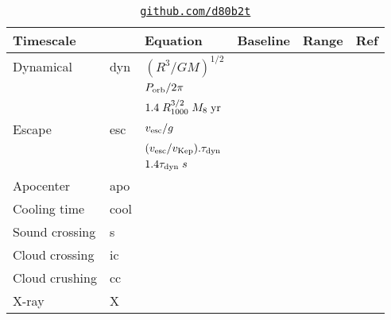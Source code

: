 \documentclass[11pt]{article}
\begin{document}
\newpage


\begin{table}
    \begin{center}
       \begin{tabular}{l l l l l l} 
        \hline
        \hline 
         Timescale   &          & Equation                                                                                                         & Baseline& Range& Ref \\
        \hline  
        \hline 
         Dynamical  & dyn    & $(R^3/GM)^{1/2}$                                            &   & & \\
                            &          & $P_{\rm orb}/2\pi$                                            &   & & \\
                            &          & $1.4 \; R_{1000}^{3/2} \; M_{8} \; {\rm yr}$         &   & & \\
           Escape        &  esc &  $v_{\rm esc} / g$                                              & & & \\
                              &         & $(v_{\rm esc} / v_{\rm Kep}) . \tau_{\rm dyn} $       & & & \\
                            &           & $1.4 \tau_{\rm dyn} \; s $                                 & & & \\
         Apocenter   & apo   &    & & & \\
         Cooling time & cool  &    & & & \\
         Sound crossing &  s  &    & & & \\
         Cloud crossing &  ic &    & & & \\
        Cloud crushing & cc  &    & & & \\
         X-ray & X  &    & & & \\
         \hline
         \hline 
       \end{tabular}
      \caption{\href{https://github.com/d80b2t}{\tt github.com/d80b2t}}
    \end{center}
\end{table}




%
%
\end{document}
